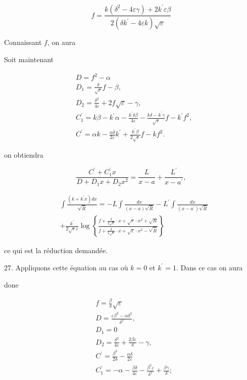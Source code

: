 \documentclass{article}
\begin{document}
\[
f=\frac{k\left(\delta^{2}-4 \varepsilon \gamma\right)+2 k^{\prime} \varepsilon \beta}{2\left(\delta k^{\prime}-4 \varepsilon k\right) \sqrt{\varepsilon}}
\]

Connaissant \(f\), on aura

Soit maintenant

\[
\begin{aligned}
& D=f^{2}-\alpha \\
& D_{1}=\frac{\delta}{\sqrt{\varepsilon}} f-\beta, \\
& D_{2}=\frac{\delta^{2}}{4 \varepsilon}+2 f \sqrt{\varepsilon}-\gamma, \\
& C_{1}^{\prime}=k \beta-k^{\prime} \alpha-\frac{k^{\prime} \delta \beta}{4 \varepsilon}-\frac{k \delta-k^{\prime} \gamma}{\sqrt{\varepsilon}} f-k^{\prime} f^{2}, \\
& C^{\prime}=\alpha k-\frac{\alpha \delta}{2 \varepsilon} k^{\prime}+\frac{k^{\prime} \beta}{2 \sqrt{\varepsilon}} f-k f^{2} .
\end{aligned}
\]

on obtiendra

\[
\frac{C^{\prime}+C_{1}^{\prime} x}{D+D_{1} x+D_{2} x^{2}}=\frac{L}{x-a}+\frac{L^{\prime}}{x-a^{\prime}},
\]

\[
\begin{aligned}
& \int \frac{\left(k+k^{\prime} x\right) d x}{\sqrt{\bar{R}}}=-L \int \frac{d x}{(x-a) \sqrt{\bar{R}}}-L^{\prime} \int \frac{d x}{\left(x-a^{\prime}\right) \sqrt{\bar{R}}} \\
& +\frac{k^{\prime}}{2 \sqrt{\varepsilon} \bar{\varepsilon}} \log \left\{\frac{f+\frac{\delta}{2 \sqrt{\varepsilon}} \cdot x+\sqrt{\varepsilon} \cdot x^{2}+\sqrt{R}}{f+\frac{\delta}{2 \sqrt{\varepsilon}} \cdot x+\sqrt{\varepsilon} \cdot x^{2}-\sqrt{\bar{R}}}\right\}
\end{aligned}
\]

ce qui est la réduction demandée.

27. Appliquons cette équation au cas où \(k=0\) et \(k^{\prime}=1\). Dans ce cas on aura

done

\[
\begin{aligned}
& f=\frac{\beta}{\delta} \sqrt{\varepsilon} \\
& D=\frac{\varepsilon \beta^{2}-\alpha \delta^{2}}{\delta^{2}}, \\
& D_{1}=0 \\
& D_{2}=\frac{\delta^{2}}{4 \varepsilon}+\frac{2 \beta \varepsilon}{\delta}-\gamma, \\
& C^{\prime}=\frac{\beta^{2}}{2 \delta}-\frac{\alpha \delta}{2 \varepsilon} \\
& C_{1}^{\prime}=-\alpha-\frac{\beta \delta}{4 \varepsilon}-\frac{\beta^{2} \varepsilon}{\delta^{2}}+\frac{\beta \gamma}{\delta} ;
\end{aligned}
\]
\end{document}
